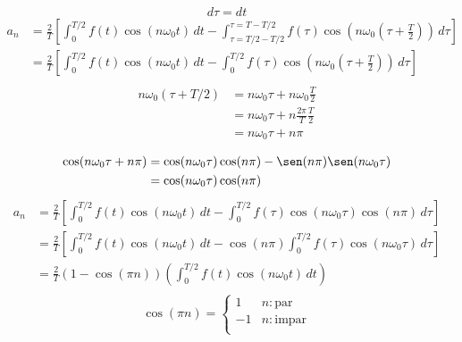 \begin{equation*}
    d\tau=dt
\end{equation*}
\begin{equation*}
\begin{split}
    a_n
        &=\frac{2}{T}\left[
            \int_0^{T/2} f(t)\cos(n\omega_0 t)\,dt-
            \int_{\tau=T/2-T/2}^{\tau=T-T/2}
                f(\tau)\cos(n\omega_0(\tau+\frac{T}{2}))\,d\tau
        \right]\\
        &=\frac{2}{T}\left[
            \int_0^{T/2} f(t)\cos(n\omega_0 t)\,dt-
            \int_0^{T/2} f(\tau)\cos(n\omega_0(\tau+\frac{T}{2}))\,d\tau
        \right]\\
\end{split}
\end{equation*}
\begin{equation*}
\begin{split}
    n\omega_0(\tau+T/2)
        &=n\omega_0\tau+n\omega_0\frac{T}{2}\\
        &=n\omega_0\tau+n\frac{2\pi}{T}\frac{T}{2}\\
        &=n\omega_0\tau+n\pi\\
\end{split}
\end{equation*}
\begin{equation*}
\begin{split}
    \cos(n\omega_0\tau+n\pi)
        &=\cos(n\omega_0\tau)\cos(n\pi)-\sen(n\pi)\sen(n\omega_0\tau)\\
        &=\cos(n\omega_0\tau)\cos(n\pi)\\
\end{split}
\end{equation*}
\begin{equation*}
\begin{split}
    a_n
        &=\frac{2}{T}\left[
            \int_0^{T/2} f(t)\cos(n\omega_0 t)\,dt-
            \int_0^{T/2} f(\tau)\cos(n\omega_0\tau)\cos(n\pi)\,d\tau
        \right]\\
        &=\frac{2}{T}\left[
            \int_0^{T/2} f(t)\cos(n\omega_0 t)\,dt-\cos(n\pi)\int_0^{T/2}
                f(\tau)\cos(n\omega_0\tau)\,d\tau
        \right]\\
        &=\frac{2}{T}(1-\cos(\pi n))\left(
            \int_0^{T/2} f(t)\cos(n\omega_0 t)\,dt
        \right)\\
\end{split}
\end{equation*}
\begin{equation*}
    \cos(\pi n)=\begin{cases}
        1 &n: \text{par}\\
        -1 &n: \text{impar}\\
    \end{cases}
\end{equation*}
